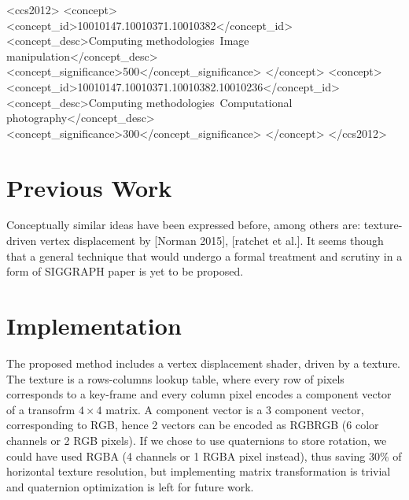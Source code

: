 \documentclass{acmsiggraph}
\begin{document}
%
%
\begin{CCSXML}
<ccs2012>
<concept>
<concept_id>10010147.10010371.10010382</concept_id>
<concept_desc>Computing methodologies~Image manipulation</concept_desc>
<concept_significance>500</concept_significance>
</concept>
<concept>
<concept_id>10010147.10010371.10010382.10010236</concept_id>
<concept_desc>Computing methodologies~Computational photography</concept_desc>
<concept_significance>300</concept_significance>
</concept>
</ccs2012>
\end{CCSXML}


%
%


\keywordlist

\conceptlist

\printcopyright




\section{Previous Work}

Conceptually similar ideas have been expressed before, among others are:
texture-driven vertex displacement by [Norman 2015], [ratchet et al.].
It seems though that a general technique that would undergo a formal treatment and scrutiny in a form of SIGGRAPH paper is yet to be proposed.

\section{Implementation}

The proposed method includes a vertex displacement shader, driven by a texture.  The texture is a rows-columns lookup table, where every row of pixels corresponds to a key-frame and every column pixel encodes a component vector of a transofrm \(4 \times 4\) matrix. A component vector is a 3 component vector, corresponding to RGB, hence 2 vectors can be encoded as RGBRGB (6 color channels or 2 RGB pixels).  If we chose to use quaternions to store rotation, we could have used RGBA (4 channels or 1 RGBA pixel instead), thus saving 30\% of horizontal texture resolution, but implementing matrix transformation is trivial and quaternion optimization is left for future work.
\end{document}
